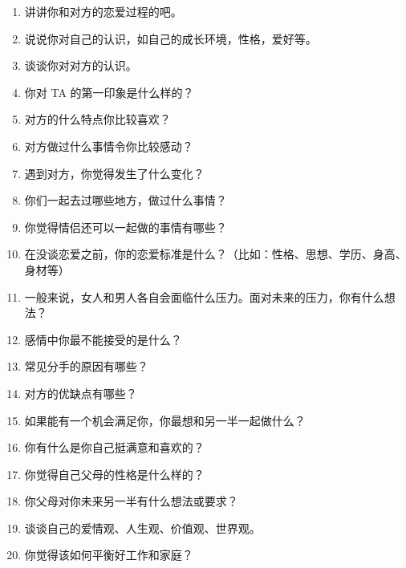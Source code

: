 \documentclass[twocolumn,landscape,UTF8]{ctexart}
\begin{document}
\begin{spacing}{1.3}
\begin{enumerate}
\item 讲讲你和对方的恋爱过程的吧。
			
\item 说说你对自己的认识，如自己的成长环境，性格，爱好等。

\item 谈谈你对对方的认识。

\item 你对 TA 的第一印象是什么样的？



\item 对方的什么特点你比较喜欢？

\item 对方做过什么事情令你比较感动？

\item 遇到对方，你觉得发生了什么变化？

\item 你们一起去过哪些地方，做过什么事情？

\item 你觉得情侣还可以一起做的事情有哪些？

\item 在没谈恋爱之前，你的恋爱标准是什么？（比如：性格、思想、学历、身高、身材等）

\item 一般来说，女人和男人各自会面临什么压力。面对未来的压力，你有什么想法？

\item 感情中你最不能接受的是什么？

\item 常见分手的原因有哪些？

\item 对方的优缺点有哪些？

\item 如果能有一个机会满足你，你最想和另一半一起做什么？

\item 你有什么是你自己挺满意和喜欢的？

\item 你觉得自己父母的性格是什么样的？

\item 你父母对你未来另一半有什么想法或要求？

\item 谈谈自己的爱情观、人生观、价值观、世界观。

\item 你觉得该如何平衡好工作和家庭？


\end{enumerate}
\end{spacing}
\end{document}
